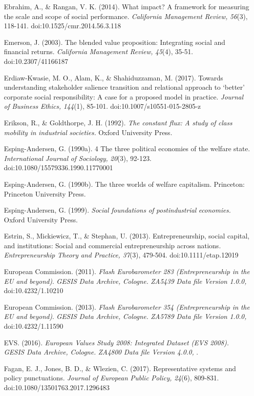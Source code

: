 \documentclass{article}
\begin{document}
Ebrahim, A., \& Rangan, V. K. (2014). What impact? A framework for measuring the scale and scope of social performance. \emph{California Management Review, 56}(3), 118-141. doi:10.1525/cmr.2014.56.3.118

Emerson, J. (2003). The blended value proposition: Integrating social and financial returns. \emph{California Management Review, 45}(4), 35-51. doi:10.2307/41166187

Erdiaw-Kwasie, M. O., Alam, K., \& Shahiduzzaman, M. (2017). Towards understanding stakeholder salience transition and relational approach to ‘better' corporate social responsibility: A case for a proposed model in practice. \emph{Journal of Business Ethics, 144}(1), 85-101. doi:10.1007/s10551-015-2805-z

Erikson, R., \& Goldthorpe, J. H. (1992). \emph{The constant flux: A study of class mobility in industrial societies.} Oxford University Press.

Esping-Andersen, G. (1990a). 4 The three political economies of the welfare state. \emph{International Journal of Sociology, 20}(3), 92-123. doi:10.1080/15579336.1990.11770001

Esping-Andersen, G. (1990b). The three worlds of welfare capitalism. Princeton: Princeton University Press.

Esping-Andersen, G. (1999). \emph{Social foundations of }\emph{postindustrial}\emph{ economies.} Oxford University Press.

Estrin, S., Mickiewicz, T., \& Stephan, U. (2013). Entrepreneurship, social capital, and institutions: Social and commercial entrepreneurship across nations. \emph{Entrepreneurship Theory and Practice, 37}(3), 479-504. doi:10.1111/etap.12019

European Commission. (2011). \emph{Flash Eurobarometer 283 (Entrepreneurship in the EU and beyond)}. \emph{GESIS Data Archive, Cologne. }\emph{ZA5439 Data file Version 1.0.0, }doi:10.4232/1.10210

European Commission. (2013). \emph{Flash Eurobarometer 354 (Entrepreneurship in the EU and beyond)}. \emph{GESIS Data Archive, Cologne. }\emph{ZA5789 Data file Version 1.0.0, }doi:10.4232/1.11590

EVS. (2016). \emph{European Values Study 2008: Integrated Dataset (EVS 2008). }\emph{GESIS Data Archive, Cologne. }\emph{ZA4800 Data file Version 4.0.0}\emph{, }. 

Fagan, E. J., Jones, B. D., \& Wlezien, C. (2017). Representative systems and policy punctuations. \emph{Journal of European Public Policy, 24}(6), 809-831. doi:10.1080/13501763.2017.1296483
\end{document}
